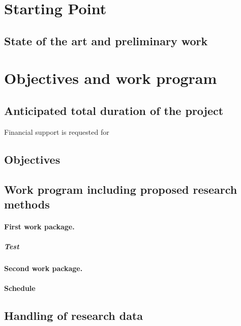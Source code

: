 \documentclass{scrartcl}
\begin{document}
\mainmatter
\makeprojecttitle

\section{Starting Point}
\label{sec:work-report}

\subsection*{State of the art and preliminary work}

\section{Objectives and work program}

\subsection{Anticipated total duration of the project}
Financial support is requested for 

\subsection{Objectives}

\subsection{Work program including proposed research methods}

\workpackagestyle
\hrulefill
\paragraph{First work package.}
\label{wp:1}
\subparagraph{Test}
\hrulefill
\paragraph{Second work package.}
\label{wp:2}

\standardstyle
\paragraph*{Schedule}

\subsection{Handling of research data}
\end{document}
